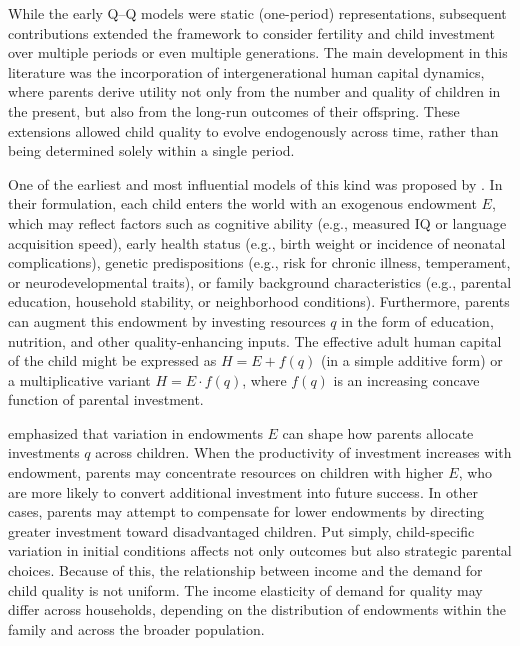 \documentclass[]{AEA}
\begin{document}
While the early Q--Q models were static (one-period) representations,
subsequent contributions extended the framework to consider fertility
and child investment over multiple periods or even multiple generations.
The main development in this literature was the incorporation of
intergenerational human capital dynamics, where parents derive utility
not only from the number and quality of children in the present, but
also from the long-run outcomes of their offspring. These extensions
allowed child quality to evolve endogenously across time, rather than
being determined solely within a single period.

One of the earliest and most influential models of this kind was
proposed by \citet{becker1976child}. In their formulation, each child
enters the world with an exogenous endowment \(E\), which may reflect
factors such as cognitive ability (e.g., measured IQ or language
acquisition speed), early health status (e.g., birth weight or incidence
of neonatal complications), genetic predispositions (e.g., risk for
chronic illness, temperament, or neurodevelopmental traits), or family
background characteristics (e.g., parental education, household
stability, or neighborhood conditions). Furthermore, parents can augment
this endowment by investing resources \(q\) in the form of education,
nutrition, and other quality-enhancing inputs. The effective adult human
capital of the child might be expressed as \(H = E + f(q)\) (in a simple
additive form) or a multiplicative variant \(H = E \cdot f(q)\), where
\(f(q)\) is an increasing concave function of parental investment.

\citet{becker1976child} emphasized that variation in endowments \(E\)
can shape how parents allocate investments \(q\) across children. When
the productivity of investment increases with endowment, parents may
concentrate resources on children with higher \(E\), who are more likely
to convert additional investment into future success. In other cases,
parents may attempt to compensate for lower endowments by directing
greater investment toward disadvantaged children. Put simply,
child-specific variation in initial conditions affects not only outcomes
but also strategic parental choices. Because of this, the relationship
between income and the demand for child quality is not uniform. The
income elasticity of demand for quality may differ across households,
depending on the distribution of endowments within the family and across
the broader population.
\end{document}
